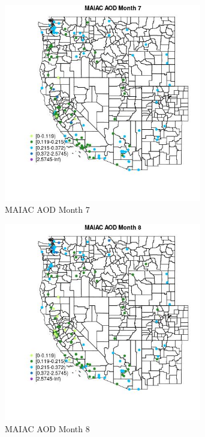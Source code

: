 \begin{figure} 
\centering  
\includegraphics[width=0.77\textwidth]{Code_Outputs/Report_ML_input_PM25_Step4_part_e_de_duplicated_aves_MapObsMo7MAIAC_AOD.jpg} 
\caption{\label{fig:Report_ML_input_PM25_Step4_part_e_de_duplicated_avesMapObsMo7MAIAC_AOD}MAIAC AOD Month 7} 
\end{figure} 
 

\begin{figure} 
\centering  
\includegraphics[width=0.77\textwidth]{Code_Outputs/Report_ML_input_PM25_Step4_part_e_de_duplicated_aves_MapObsMo8MAIAC_AOD.jpg} 
\caption{\label{fig:Report_ML_input_PM25_Step4_part_e_de_duplicated_avesMapObsMo8MAIAC_AOD}MAIAC AOD Month 8} 
\end{figure} 
 

